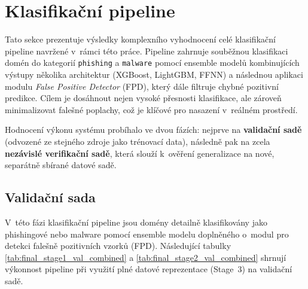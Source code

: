 

\section{Klasifikační pipeline}
\label{res:classification_pipeline}


Tato sekce prezentuje výsledky komplexního vyhodnocení celé klasifikační pipeline navržené v~rámci této práce. Pipeline zahrnuje souběžnou klasifikaci domén do kategorií \texttt{phishing} a \texttt{malware} pomocí ensemble modelů kombinujících výstupy několika architektur (XGBoost, LightGBM, FFNN) a následnou aplikaci modulu \textit{False Positive Detector} (FPD), který dále filtruje chybné pozitivní predikce. Cílem je dosáhnout nejen vysoké přesnosti klasifikace, ale zároveň minimalizovat falešné poplachy, což je klíčové pro nasazení v~reálném prostředí.

Hodnocení výkonu systému probíhalo ve dvou fázích: nejprve na \textbf{validační sadě} (odvozené ze stejného zdroje jako trénovací data), následně pak na zcela \textbf{nezávislé verifikační sadě}, která slouží k~ověření generalizace na nové, separátně sbírané datové sadě. 


\subsection{Validační sada}

V~této fázi klasifikační pipeline jsou domény detailně klasifikovány jako phishingové nebo malware pomocí ensemble modelu doplněného o~modul pro detekci falešně pozitivních vzorků (FPD). Následující tabulky \ref{tab:final_stage1_val_combined} a \ref{tab:final_stage2_val_combined} shrnují výkonnost pipeline při využití plné datové reprezentace (Stage~3) na validační sadě. 



